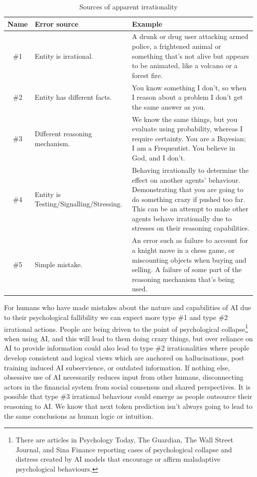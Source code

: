 \documentclass[11pt]{article}
\begin{document}
\begin{table}[htbp]
\centering
\caption{Sources of apparent irrationality}
\begin{tabular}{|c|>{\raggedright\arraybackslash}p{3.2cm}|>{\raggedright\arraybackslash}p{9cm}|}
\hline
\textbf{Name} & \textbf{Error source} & \textbf{Example} \\
\hline

\#1 & Entity is irrational. &
A drunk or drug user attacking armed police, a frightened animal or something that's not alive but appears to be animated, like a volcano or a forest fire. \\
\hline

\#2 & Entity has different facts. &
You know something I don't, so when I reason about a problem I don't get the same answer as you. \\
\hline

\#3 & Different reasoning mechanism. &
We know the same things, but you evaluate using probability, whereas I require certainty. You are a Bayesian; I am a Frequentist. You believe in God, and I don't. \\
\hline

\#4 & Entity is Testing\slash Signalling\slash Stressing. &
Behaving irrationally to determine the effect on another agents' behaviour. Demonstrating that you are going to do something crazy if pushed too far. This can be an attempt to make other agents behave irrationally due to stresses on their reasoning capabilities. \\
\hline

\#5 & Simple mistake. &
An error such as failure to account for a knight move in a chess game, or miscounting objects when buying and selling. A failure of some part of the reasoning mechanism that's being used. \\
\hline

\end{tabular}
\end{table}

For humans who have made mistakes about the nature and capabilities of AI due to their psychological fallibility we can expect more type \#1 and type \#2 irrational actions. People are being driven to the point of psychological collapse\footnote{There are articles in Psychology Today, The Guardian, The Wall Street Journal, and Sina Finance reporting cases of psychological collapse and distress created by AI models that encourage or affirm maladaptive psychological behaviours.} when using AI, and this will lead to them doing crazy things, but over reliance on AI to provide information could  also lead to type \#2 irrationalities where people develop consistent and logical views which are anchored on hallucinations, post training induced AI subservience, or outdated information. If nothing else, obsessive use of AI necessarily reduces input from other humans, disconnecting actors in the financial system from social consensus and shared perspectives. It is possible that type \#3 irrational behaviour could emerge as people outsource their reasoning to AI. We know that next token prediction isn't always going to lead to the same conclusions as human logic or intuition. 
\end{document}
